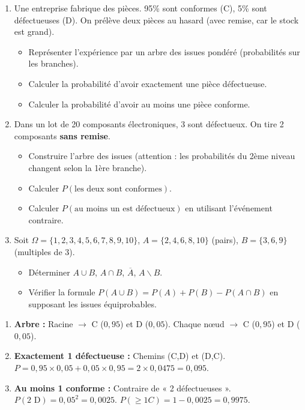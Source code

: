 \documentclass[11pt]{article}
\def\setminus{\mathbin{\backslash}}\let\smallsetminus\setminus
\begin{document}
\begin{exercice}
\begin{enumerate}
    \item Une entreprise fabrique des pièces. 95\% sont conformes (C), 5\% sont défectueuses (D). On prélève deux pièces au hasard (avec remise, car le stock est grand).
    \begin{itemize}
        \item[a)] Représenter l'expérience par un arbre des issues pondéré (probabilités sur les branches).
        \item[b)] Calculer la probabilité d'avoir exactement une pièce défectueuse.
        \item[c)] Calculer la probabilité d'avoir au moins une pièce conforme.
    \end{itemize}
    \item Dans un lot de 20 composants électroniques, 3 sont défectueux. On tire 2 composants \textbf{sans remise}.
    \begin{itemize}
        \item[a)] Construire l'arbre des issues (attention : les probabilités du 2ème niveau changent selon la 1ère branche).
        \item[b)] Calculer $P(\text{les deux sont conformes})$.
        \item[c)] Calculer $P(\text{au moins un est défectueux})$ en utilisant l'événement contraire.
    \end{itemize}
    \item Soit $\Omega = \{1,2,3,4,5,6,7,8,9,10\}$, $A = \{2,4,6,8,10\}$ (pairs), $B = \{3,6,9\}$ (multiples de 3).
    \begin{itemize}
        \item[a)] Déterminer $A \cup B$, $A \cap B$, $\overline{A}$, $A \setminus B$.
        \item[b)] Vérifier la formule $P(A \cup B) = P(A) + P(B) - P(A \cap B)$ en supposant les issues équiprobables.
    \end{itemize}
\end{enumerate}
\end{exercice}

\begin{corrige}[Exercice 1]
\begin{enumerate}
    \item \textbf{Arbre :} Racine $\to$ C ($0,95$) et D ($0,05$). Chaque nœud $\to$ C ($0,95$) et D ($0,05$).
    \item \textbf{Exactement 1 défectueuse :} Chemins (C,D) et (D,C). $P = 0,95 \times 0,05 + 0,05 \times 0,95 = 2 \times 0,0475 = 0,095$.
    \item \textbf{Au moins 1 conforme :} Contraire de « 2 défectueuses ». $P(\text{2 D}) = 0,05^2 = 0,0025$. $P(\ge 1 C) = 1 - 0,0025 = 0,9975$.
\end{enumerate}
\end{corrige}
\end{document}
